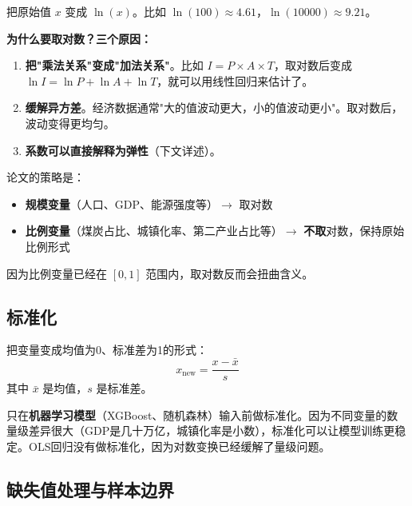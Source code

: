 \documentclass[12pt, a4paper]{article}
\begin{document}
\begin{conceptbox}[对数变换]
把原始值 $x$ 变成 $\ln(x)$。比如 $\ln(100) \approx 4.61$，$\ln(10000) \approx 9.21$。
\end{conceptbox}

\textbf{为什么要取对数？三个原因：}

\begin{enumerate}[leftmargin=2em]
\item \textbf{把"乘法关系"变成"加法关系"}。比如 $I = P \times A \times T$，取对数后变成 $\ln I = \ln P + \ln A + \ln T$，就可以用线性回归来估计了。
\item \textbf{缓解异方差}。经济数据通常"大的值波动更大，小的值波动更小"。取对数后，波动变得更均匀。
\item \textbf{系数可以直接解释为弹性}（下文详述）。
\end{enumerate}

\begin{warningbox}
论文的策略是：
\begin{itemize}[leftmargin=2em]
\item \textbf{规模变量}（人口、GDP、能源强度等）$\to$ 取对数
\item \textbf{比例变量}（煤炭占比、城镇化率、第二产业占比等）$\to$ \textbf{不取}对数，保持原始比例形式
\end{itemize}
因为比例变量已经在 $[0,1]$ 范围内，取对数反而会扭曲含义。
\end{warningbox}

\subsection{标准化}

\begin{conceptbox}[标准化]
把变量变成均值为0、标准差为1的形式：
\[
x_{\text{new}} = \frac{x - \bar{x}}{s}
\]
其中 $\bar{x}$ 是均值，$s$ 是标准差。
\end{conceptbox}

\begin{tipbox}[论文中标准化用在哪里？]
只在\textbf{机器学习模型}（XGBoost、随机森林）输入前做标准化。因为不同变量的数量级差异很大（GDP是几十万亿，城镇化率是小数），标准化可以让模型训练更稳定。OLS回归没有做标准化，因为对数变换已经缓解了量级问题。
\end{tipbox}

\subsection{缺失值处理与样本边界}
\end{document}
